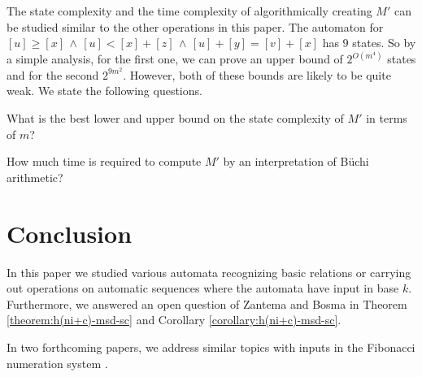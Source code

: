 \documentclass[12pt,reqno]{article}
\def\AND{\, \wedge \,}
\begin{document}
The state complexity and the time complexity of algorithmically creating $M'$ can be studied similar to the other operations in this paper.
The automaton for $[u] \geq [x] \AND [u] < [x] + [z] \AND [u] + [y] = [v] + [x]$ has $9$ states. So by a simple analysis, for the first one, we can prove an upper bound of $2^{O(m^4)}$ states and for the second
$2^{9m^2}$. However, both of these bounds are likely to be quite weak.  We state the following questions.


\begin{openproblem}
    What is the best lower and upper bound on the state complexity of $M'$ in terms of $m$?
\end{openproblem}

\begin{openproblem}
    How much time is required to compute $M'$ by  an interpretation of B\"uchi arithmetic?
\end{openproblem}



\section{Conclusion}
In this paper we studied various automata recognizing basic relations or carrying out operations on automatic sequences where the automata have input in base $k$. Furthermore, we answered an open question of Zantema and Bosma \cite{zantema_complexity_2022} in Theorem \ref{theorem:h(ni+c)-msd-sc} and Corollary \ref{corollary:h(ni+c)-msd-sc}.

In two forthcoming papers, we address similar topics with inputs in the Fibonacci numeration system \cite{moradi_complexity_2026_2,moradi_state_2026}.



\end{document}
